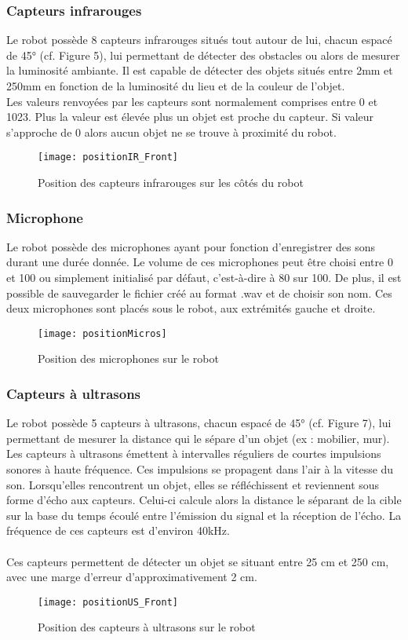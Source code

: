 \documentclass[11pt]{article} %
\begin{document}
\subsubsection{Capteurs infrarouges}
Le robot possède 8 capteurs infrarouges situés tout autour de lui, chacun espacé de 45° (cf. Figure 5), lui permettant de détecter des obstacles ou alors de mesurer la luminosité ambiante. Il est capable de détecter des objets situés entre 2mm et 250mm en fonction de la luminosité du lieu et de la couleur de l’objet.\\
Les valeurs renvoyées par les capteurs sont normalement comprises entre 0 et 1023. Plus la valeur est élevée plus un objet est proche du capteur. Si valeur s’approche de 0 alors aucun objet ne se trouve à proximité du robot.\\
\begin{figure}[H]
	\centering
	\caption{Position des capteurs infrarouges sur les côtés du robot}
	\texttt{[image: positionIR\_Front]}
\end{figure}
\subsubsection{Microphone}
Le robot possède des microphones ayant pour fonction d’enregistrer des sons durant une durée donnée. Le volume de ces microphones peut être choisi entre 0 et 100 ou simplement initialisé par défaut, c’est-à-dire à 80 sur 100. De plus, il est possible de sauvegarder le fichier créé au format .wav et de choisir son nom. 
Ces deux microphones sont placés sous le robot, aux extrémités gauche et droite. \\
\begin{figure}[H]
	\centering
	\caption{Position des microphones sur le robot}
	\texttt{[image: positionMicros]}
\end{figure}
\subsubsection{Capteurs à ultrasons}
Le robot possède 5 capteurs à ultrasons, chacun espacé de 45° (cf. Figure 7), lui permettant de mesurer la distance qui le sépare d’un objet (ex : mobilier, mur). \\
Les capteurs à ultrasons émettent à intervalles réguliers de courtes impulsions sonores à haute fréquence. Ces impulsions se propagent dans l’air à la vitesse du son. Lorsqu’elles rencontrent un objet, elles se réfléchissent et reviennent sous forme d’écho aux capteurs. Celui-ci calcule alors la distance le séparant de la cible sur la base du temps écoulé entre l’émission du signal et la réception de l’écho. La fréquence de ces capteurs est d’environ 40kHz. \\
\\
Ces capteurs permettent de détecter un objet se situant entre 25 cm et 250 cm, avec une marge d’erreur d’approximativement 2 cm.\\
\begin{figure}[H]
	\centering
	\caption{Position des capteurs à ultrasons sur le robot}
	\texttt{[image: positionUS\_Front]}
\end{figure}
\end{document}
